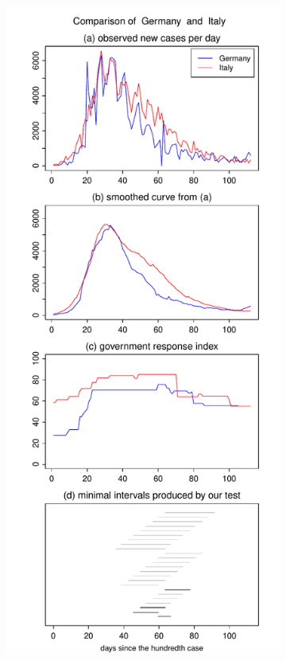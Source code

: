 \documentclass[a4paper,12pt]{article}
\numberwithin{equation}{section}
\begin{document}
\begin{figure}[t!]
\begin{subfigure}[b]{0.49\textwidth}
\end{subfigure}\hspace{0.55cm}
\begin{subfigure}[b]{0.49\textwidth}
\includegraphics[width=\textwidth]{plots/DEU_vs_ITA}
\end{subfigure}
\end{figure}
\end{document}
